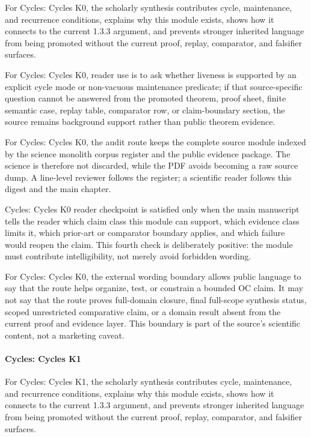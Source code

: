 For Cycles: Cycles K0, the scholarly synthesis contributes cycle, maintenance, and recurrence conditions, explains why this module exists, shows how it connects to the current 1.3.3 argument, and prevents stronger inherited language from being promoted without the current proof, replay, comparator, and falsifier surfaces.


For Cycles: Cycles K0, reader use is to ask whether liveness is supported by an explicit cycle mode or non-vacuous maintenance predicate; if that source-specific question cannot be answered from the promoted theorem, proof sheet, finite semantic case, replay table, comparator row, or claim-boundary section, the source remains background support rather than public theorem evidence.


For Cycles: Cycles K0, the audit route keeps the complete source module indexed by the science monolith corpus register and the public evidence package. The science is therefore not discarded, while the PDF avoids becoming a raw source dump. A line-level reviewer follows the register; a scientific reader follows this digest and the main chapter.


Cycles: Cycles K0 reader checkpoint is satisfied only when the main manuscript tells the reader which claim class this module can support, which evidence class limits it, which prior-art or comparator boundary applies, and which failure would reopen the claim. This fourth check is deliberately positive: the module must contribute intelligibility, not merely avoid forbidden wording.


For Cycles: Cycles K0, the external wording boundary allows public language to say that the route helps organize, test, or constrain a bounded OC claim. It may not say that the route proves full-domain closure, final full-scope synthesis status, scoped unrestricted comparative claim, or a domain result absent from the current proof and evidence layer. This boundary is part of the source's scientific content, not a marketing caveat.


\paragraph{Cycles: Cycles K1}

For Cycles: Cycles K1, the scholarly synthesis contributes cycle, maintenance, and recurrence conditions, explains why this module exists, shows how it connects to the current 1.3.3 argument, and prevents stronger inherited language from being promoted without the current proof, replay, comparator, and falsifier surfaces.


